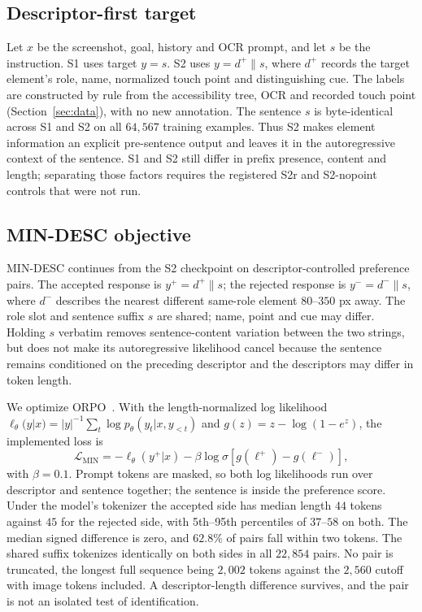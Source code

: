 \documentclass[conference]{IEEEtran}
\begin{document}
\subsection{Descriptor-first target}

Let $x$ be the screenshot, goal, history and OCR prompt, and let $s$ be the instruction. S1
uses target $y=s$. S2 uses $y=d^{+}\mathbin{\|}s$, where $d^{+}$ records the target element's
role, name, normalized touch point and distinguishing cue. The labels are constructed by
rule from the accessibility tree, OCR and recorded touch point (Section~\ref{sec:data}), with
no new annotation. The sentence $s$ is byte-identical across S1 and S2 on all $64{,}567$
training examples. Thus S2 makes element information an explicit pre-sentence output and
leaves it in the autoregressive context of the sentence. S1 and S2 still differ in prefix
presence, content and length; separating those factors requires the registered S2r and
S2-nopoint controls that were not run.

\subsection{MIN-DESC objective}

MIN-DESC continues from the S2 checkpoint on descriptor-controlled preference pairs. The
accepted response is $y^{+}=d^{+}\mathbin{\|}s$; the rejected response is
$y^{-}=d^{-}\mathbin{\|}s$, where $d^{-}$ describes the nearest different same-role element
$80$--$350$ px away. The role slot and sentence suffix $s$ are shared; name, point and cue may
differ. Holding $s$ verbatim removes sentence-content variation between the two strings, but
does not make its autoregressive likelihood cancel because the sentence remains conditioned
on the preceding descriptor and the descriptors may differ in token length.

We optimize ORPO~\cite{orpo}. With the length-normalized log likelihood
$\ell_\theta(y|x)=|y|^{-1}\sum_t\log p_\theta(y_t|x,y_{<t})$ and $g(z)=z-\log(1-e^{z})$, the
implemented loss is
\[
\mathcal{L}_{\mathrm{MIN}}=-\ell_\theta(y^{+}|x)
-\beta\log\sigma\!\left[g(\ell^{+})-g(\ell^{-})\right],
\]
with $\beta=0.1$. Prompt tokens are masked, so both log likelihoods run over descriptor and
sentence together; the sentence is inside the preference score. Under the model's tokenizer
the accepted side has median length $44$ tokens against $45$ for the rejected side, with
5th--95th percentiles of $37$--$58$ on both. The median signed difference is zero, and
$62.8\%$ of pairs fall within two tokens. The shared suffix tokenizes identically on both
sides in all $22{,}854$ pairs. No pair is truncated, the longest full sequence being $2{,}002$
tokens against the $2{,}560$ cutoff with image tokens included. A descriptor-length difference
survives, and the pair is not an isolated test of identification.
\end{document}
